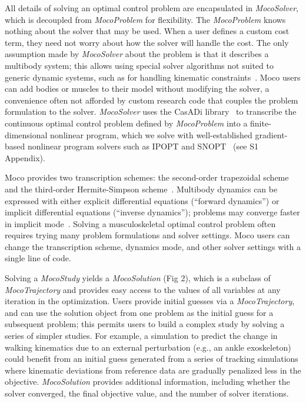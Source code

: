 \documentclass[10pt,letterpaper]{article}
\begin{document}
All details of solving an optimal control problem are encapsulated in \textit{MocoSolver}, which is decoupled from \textit{MocoProblem} for flexibility. The \textit{MocoProblem} knows nothing about the solver that may be used. When a user defines a custom cost term, they need not worry about how the solver will handle the cost. The only assumption made by \textit{MocoSolver} about the problem is that it describes a multibody system; this allows using special solver algorithms not suited to generic dynamic systems, such as for handling kinematic constraints~\cite{Posa:2016}. Moco users can add bodies or muscles to their model without modifying the solver, a convenience often not afforded by custom research code that couples the problem formulation to the solver. \textit{MocoSolver} uses the CasADi library~\cite{Andersson:2019} to transcribe the continuous optimal control problem defined by \textit{MocoProblem} into a finite-dimensional nonlinear program, which we solve with well-established gradient-based nonlinear program solvers such as IPOPT and SNOPT~\cite{Wachter:2006,Gill:2005} (see S1 Appendix).

Moco provides two transcription schemes: the second-order trapezoidal scheme and the third-order Hermite-Simpson scheme~\cite{Betts:2010}. Multibody dynamics can be expressed with either explicit differential equations (“forward dynamics”) or implicit differential equations (“inverse dynamics”); problems may converge faster in implicit mode~\cite{vandenBogert:2011fv,Groote:2016dq}. Solving a musculoskeletal optimal control problem often requires trying many problem formulations and solver settings. Moco users can change the transcription scheme, dynamics mode, and other solver settings with a single line of code.

Solving a \textit{MocoStudy} yields a \textit{MocoSolution} (Fig 2), which is a subclass of \textit{MocoTrajectory} and provides easy access to the values of all variables at any iteration in the optimization. Users provide initial guesses via a \textit{MocoTrajectory}, and can use the solution object from one problem as the initial guess for a subsequent problem; this permits users to build a complex study by solving a series of simpler studies. For example, a simulation to predict the change in walking kinematics due to an external perturbation (e.g., an ankle exoskeleton) could benefit from an initial guess generated from a series of tracking simulations where kinematic deviations from reference data are gradually penalized less in the objective.  \textit{MocoSolution} provides additional information, including whether the solver converged, the final objective value, and the number of solver iterations.
\end{document}
